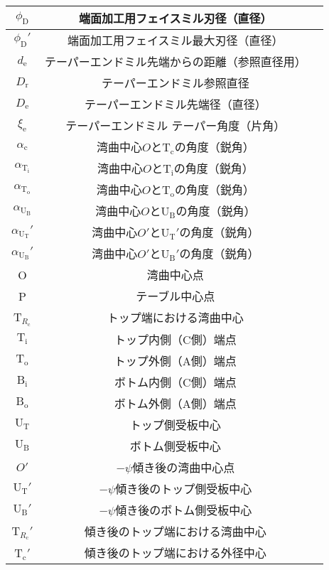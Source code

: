 \begin{longtable}{|c|Sl|}
$\phi_\mathrm D$ & 端面加工用フェイスミル刃径（直径）\\\hline
$\phi_\mathrm D'$ & 端面加工用フェイスミル最大刃径（直径）\\\hline
$d_\mathrm e$ & テーパーエンドミル先端からの距離（参照直径用）\\\hline
$D_\mathrm r$ & テーパーエンドミル参照直径\\\hline
$D_\mathrm e$ & テーパーエンドミル先端径（直径）\\\hline
$\xi_\mathrm e$ & テーパーエンドミル テーパー角度（片角）\\\hline
\hline
$\alpha_{\mathrm c}$ & 湾曲中心$O$と$\mathrm T_\mathrm c$の角度（鋭角）\\\hline
$\alpha_{\mathrm T_\mathrm i}$ & 湾曲中心$O$と$\mathrm T_\mathrm i$の角度（鋭角）\\\hline
$\alpha_{\mathrm T_\mathrm o}$ & 湾曲中心$O$と$\mathrm T_\mathrm o$の角度（鋭角）\\\hline
$\alpha_{\mathrm U_\mathrm B}$ & 湾曲中心$O$と$\mathrm U_\mathrm B$の角度（鋭角）\\\hline
$\alpha_{\mathrm U_\mathrm T}'$ & 湾曲中心$O'$と$\mathrm U_\mathrm T'$の角度（鋭角）\\\hline
$\alpha_{\mathrm U_\mathrm B}'$ & 湾曲中心$O'$と$\mathrm U_\mathrm B'$の角度（鋭角）\\\hline
\hline
O & 湾曲中心点\\\hline
P & テーブル中心点\\\hline
T$_{R_\mathrm c}$ & トップ端における湾曲中心\\\hline
$\mathrm T_\mathrm i$ & トップ内側（C側）端点\\\hline
$\mathrm T_\mathrm o$ & トップ外側（A側）端点\\\hline
$\mathrm B_\mathrm i$ & ボトム内側（C側）端点\\\hline
$\mathrm B_\mathrm o$ & ボトム外側（A側）端点\\\hline
$\mathrm U_\mathrm T$ & トップ側受板中心\\\hline
$\mathrm U_\mathrm B$ & ボトム側受板中心\\\hline
$O'$ & $-\psi$傾き後の湾曲中心点\\\hline
$\mathrm U_\mathrm T'$ & $-\psi$傾き後のトップ側受板中心\\\hline
$\mathrm U_\mathrm B'$ & $-\psi$傾き後のボトム側受板中心\\\hline
T$_{R_\mathrm c}'$ & 傾き後のトップ端における湾曲中心\\\hline
T$_\mathrm c'$ & 傾き後のトップ端における外径中心\\\hline

\end{longtable}
